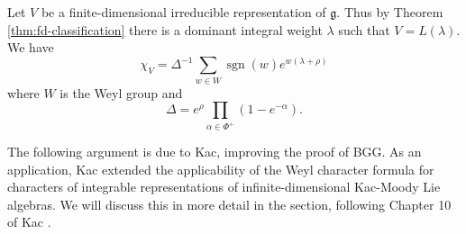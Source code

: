 \documentclass[12pt]{article}
\begin{document}
\begin{theorem}
    Let $V$ be a finite-dimensional irreducible representation of $\mathfrak{g}$. Thus by Theorem \ref{thm:fd-classification} there is a dominant integral weight $\lambda$ such that $V = L(\lambda)$. We have
    \[
        \chi_V = \Delta^{-1} \sum_{w \in W} \operatorname{sgn}(w) e^{w(\lambda + \rho)}
    \]
    where $W$ is the Weyl group and
    \[
        \Delta = e^{\rho} \prod_{\alpha \in \Phi^+} (1 - e^{-\alpha}).
    \]
\end{theorem}

The following argument is due to Kac, improving the proof of BGG.  As an application, Kac extended the applicability of the Weyl character formula for characters of integrable representations of infinite-dimensional Kac-Moody Lie algebras. We will discuss this in more detail in the section, following Chapter 10 of Kac \cite{kac}.
\end{document}
